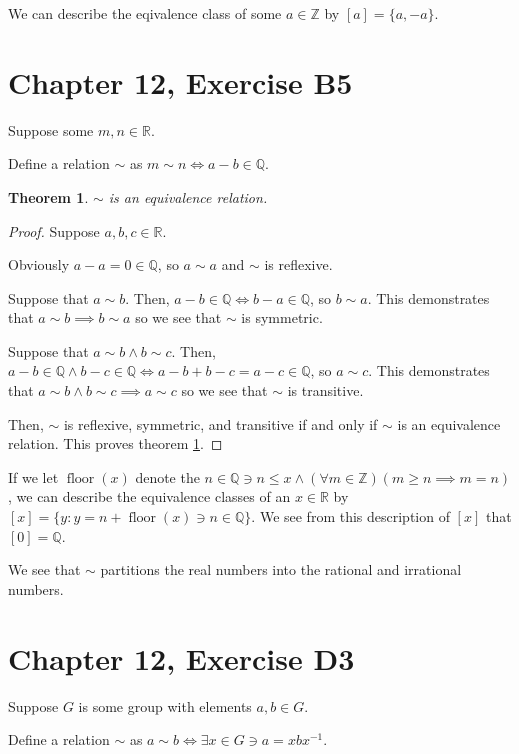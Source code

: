 \documentclass[12pt]{article}
\newcommand{\reals}{\mathbb{R}}
\newcommand{\rats}{\mathbb{Q}}
\newcommand{\ints}{\mathbb{Z}}
\newtheorem{thm}{Theorem}
\begin{document}
We can describe the eqivalence class of some $a \in \ints$
by $[a] = \{a, -a\}$.

\section{Chapter 12, Exercise B5}

Suppose some $m,n \in \reals$.

Define a relation $\sim$ as $m \sim n \iff a - b \in \rats$.

\begin{thm} \label{thm10}
	$\sim$ is an equivalence relation.
\end{thm}

\begin{proof}
	Suppose $a,b,c \in \reals$.

	Obviously $a - a = 0 \in \rats$,
	so $a \sim a$
	and $\sim$ is reflexive.

	Suppose that $a \sim b$.
	Then, $a - b \in \rats \iff b - a \in \rats$,
	so $b \sim a$.
	This demonstrates that $a \sim b \implies b \sim a$
	so we see that $\sim$ is symmetric.

	Suppose that $a \sim b \land b \sim c$.
	Then, $a - b \in \rats \land b - c \in \rats \iff a - b + b - c = a - c \in \rats$,
	so $a \sim c$.
	This demonstrates that $a \sim b \land b \sim c \implies a \sim c$
	so we see that $\sim$ is transitive.

	Then,
	$\sim$ is
	reflexive,
	symmetric,
	and transitive
	if and only if
	$\sim$ is an equivalence relation.
	This proves theorem \ref{thm10}.
\end{proof}

If we let $\operatorname{floor}(x)$ denote the
$n \in \rats \ni n \le x \land (\forall m \in \ints)(m \geq n \implies m = n)$,
we can describe the equivalence classes of an $x \in \reals$
by $[x] = \{y: y = n + \operatorname{floor}(x) \ni n \in \rats \}$.
We see from this description of $[x]$ that $[0] = \rats$.

We see that $\sim$ partitions the real numbers into the rational and irrational numbers.

\section{Chapter 12, Exercise D3}

Suppose $G$ is some group with elements $a,b \in G$.

Define a relation $\sim$ as $a \sim b \iff \exists x \in G \ni a = xbx^{-1}$.
\end{document}
